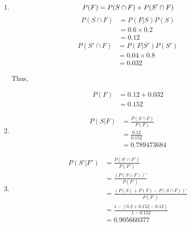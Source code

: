 \documentclass{article}
\begin{document}
\begin{enumerate}[label=(\alph*)]
    \item
        \begin{equation*}
            P(F) = P(S \cap F) + P(S' \cap F) \\
        \end{equation*}
        \begin{equation*}
            \begin{aligned}
                P(S \cap F) &= P(F \vert S) P(S) \\
                            &= 0.6 \times 0.2 \\
                            &= 0.12
            \end{aligned}
        \end{equation*}
        \begin{equation*}
            \begin{aligned}
                P(S' \cap F) &= P(F \vert S') P(S') \\
                             &= 0.04 \times 0.8 \\
                             &= 0.032
            \end{aligned}
        \end{equation*}

        Thus,

        \begin{equation*}
            \begin{aligned}
                P(F) &= 0.12 + 0.032 \\
                     &= 0.152
            \end{aligned}
        \end{equation*}

    \item
        \begin{equation*}
            \begin{aligned}
                P(S \vert F) &= \frac{P(S \cap F)}{P(F)} \\
                             &= \frac{0.12}{0.152} \\
                             &= 0.789473684
            \end{aligned}
        \end{equation*}

    \item
        \begin{equation*}
            \begin{aligned}
                P(S' \vert F') &= \frac{P(S' \cap F')}{P(F')} \\
                               &= \frac{(P(S \cup F))'}{P(F')} \\
                               &= \frac{(P(S) + P(F) - P(S \cap F))'}{P(F')} \\
                               &= \frac{1 - (0.2 + 0.152 - 0.12)}{1 - 0.152} \\
                               &= 0.905660377
            \end{aligned}
        \end{equation*}
\end{enumerate}
\end{document}
